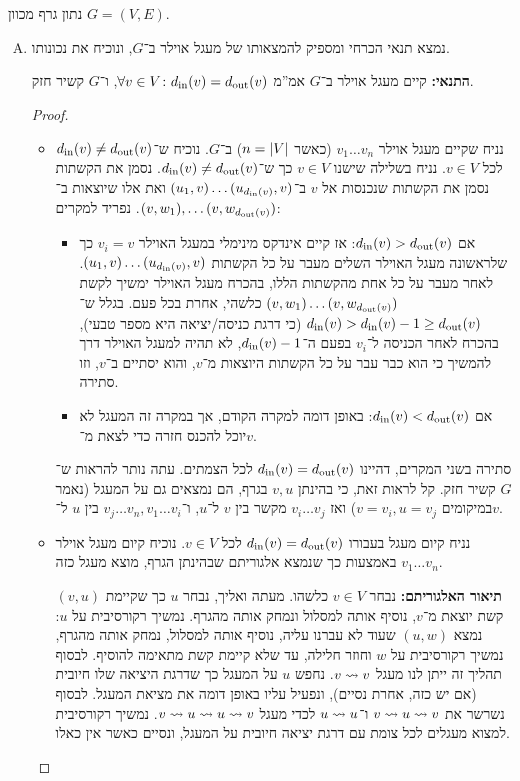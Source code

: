 \documentclass[]{../../../../tex/classes/homework}
\begin{document}
	\section{}
	נתון גרף מכוון $G = (V, E)$. 
	\begin{enumerate}[(A)]
		\item נמצא תנאי הכרחי ומספיק להמצאותו של מעגל אוילר ב־$G$, ונוכיח את נכונותו. 
		
		\textbf{התנאי: }קיים מעגל אוילר ב־$G$ אמ''מ $\forall v \in V \colon d_{\mathrm{in}}(v) = d_{\mathrm{out}}(v)$, ו־$G$ קשיר חזק. \\
		\begin{proof}\ 
			\begin{itemize}
				\item[$\impliedby$]נניח שקיים מעגל אוילר $v_1 \dots v_n$ (כאשר $n = \left \lvert V \right \rvert$) ב־$G$. נוכיח ש־$d_{\mathrm{in}}(v) \neq d_{\mathrm{out}}(v)$ לכל $v \in V$. נניח בשלילה שישנו $v \in V$ כך ש־$d_{\mathrm{in}}(v) \neq d_{\mathrm{out}}(v)$. נסמן את הקשתות נסמן את הקשתות שנכנסות אל $v$ ב־$(u_1, v) \dots (u_{d_{\mathrm{in}}(v)}, v)$ ואת אלו שיוצאות ב־$(v, w_1), \dots (v, w_{d_{\mathrm{out}}(v)})$. נפריד למקרים: 
				\begin{itemize}
					\item אם $d_{\mathrm{in}}(v) > d_{\mathrm{out}}(v)$: אז קיים אינדקס מינימלי במעגל האוילר $v_i = v$ כך שלראשונה מעגל האוילר השלים מעבר על כל הקשתות $(u_1, v) \dots (u_{d_{\mathrm{in}}(v)}, v)$. לאחר מעבר על כל אחת מהקשתות הללו, בהכרח מעגל האוילר ימשיך לקשת $(v, w_1) \dots (v, w_{d_{\mathrm{out}}(v)})$ כלשהי, אחרת בכל פעם. בגלל ש־$d_{\mathrm{in}}(v) > d_{\mathrm{in}}(v) - 1 \ge d_{\mathrm{out}}(v)$ (כי דרגת כניסה/יציאה היא מספר טבעי), בהכרח לאחר הכניסה ל־$v_i$ בפעם ה־$d_{\mathrm{in}}(v) - 1$, לא תהיה למעגל האוילר דרך להמשיך כי הוא כבר עבר על כל הקשתות היוצאות מ־$v$, והוא יסתיים ב־$v$, וזו סתירה. 
					\item אם $d_{\mathrm{in}}(v) < d_{\mathrm{out}}(v)$: באופן דומה למקרה הקודם, אך במקרה זה המעגל לא יוכל להכנס חזרה כדי לצאת מ־$v$. 
				\end{itemize}
				סתירה בשני המקרים, דהיינו $d_{\mathrm{in}}(v) = d_{\mathrm{out}}(v)$ לכל הצמתים. עתה נותר להראות ש־$G$ קשיר חזק. קל לראות זאת, כי בהינתן $v, u$ בגרף, הם נמצאים גם על המעגל (נאמר במיקומים $v = v_i, u = v_j$) ואז $v_i \dots v_j$ מקשר בין $v$ ל־$u$, ו־$v_j \dots v_n, v_1 \dots v_i$ בין $u$ ל־$v$. 
				\item[$\implies$]נניח קיום מעגל בעבורו $d_{\mathrm{in}}(v) = d_{\mathrm{out}}(v)$ לכל $v \in V$. נוכיח קיום מעגל אוילר $v_1 \dots v_n$ באמצעות כך שנמצא אלגוריתם שבהינתן הגרף, מוצא מעגל כזה. 
				
				\textbf{תיאור האלגוריתם: }נבחר $v \in V$ כלשהו. מעתה ואליך, נבחר $u$ כך שקיימת $(v, u)$ קשת יוצאת מ־$v$, נוסיף אותה למסלול ונמחק אותה מהגרף. נמשיך רקורסיבית על $u$: נמצא $(u, w)$ שעוד לא עברנו עליה, נוסיף אותה למסלול, נמחק אותה מהגרף, נמשיך רקורסיבית על $w$ וחוזר חלילה, עד שלא קיימת קשת מתאימה להוסיף. לבסוף תהליך זה ייתן לנו מעגל $v \rightsquigarrow v$. נחפש $u$ על המעגל כך שדרגת היציאה שלו חיובית (אם יש כזה, אחרת נסיים), ונפעיל עליו באופן דומה את מציאת המעגל. לבסוף נשרשר את $v \rightsquigarrow u \rightsquigarrow v$ ו־$u \rightsquigarrow u$ לכדי מעגל $v \rightsquigarrow u \rightsquigarrow u \rightsquigarrow v$. נמשיך רקורסיבית למצוא מעגלים לכל צומת עם דרגת יציאה חיובית על המעגל, ונסיים כאשר אין כאלו. 
				

\end{itemize}
\end{proof}
\end{enumerate}
\end{document}
